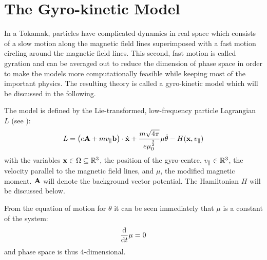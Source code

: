 

\section{The Gyro-kinetic Model}
\label{sec:introduction}

In a Tokamak, particles have complicated dynamics in real space which consists of a slow motion along the magnetic field lines superimposed with a fast motion circling around the magnetic field lines. This second, fast motion is called gyration and can be averaged out to reduce the dimension of phase space in order to make the models more computationally feasible while keeping most of the important physics. The resulting theory is called a gyro-kinetic model which will be discussed in the following.

The model is defined by the Lie-transformed, low-frequency particle Lagrangian $L$ (see \cite{Bottino_Sonnendrucker_2015}):
\begin{equation}\label{Lagrangian}
	L = \left(e\mathbf{A} + m v_\parallel \mathbf{b} \right)\cdot\dot{\mathbf{x}} + \frac{m\sqrt{4\pi}}{e \mu_0^{\frac{3}{2}}} \mu \dot{\theta} - H(\mathbf{x}, v_\parallel)
\end{equation}
with the variables $\mathbf{x} \in \Omega \subseteq \mathbb{R}^3$, the position of the gyro-centre, $v_\parallel \in \mathbb{R}^3$, the velocity parallel to the magnetic field lines, and $\mu$, the modified magnetic moment. $\mathbf{A}$ will denote the background vector potential. The Hamiltonian $H$ will be discussed below.

From the equation of motion for $\theta$ it can be seen immediately that $\mu$ is a constant of the system:
\begin{equation}
	\frac{\text{d} }{\text{d} t} \mu = 0
\end{equation}
and phase space is thus 4-dimensional.

